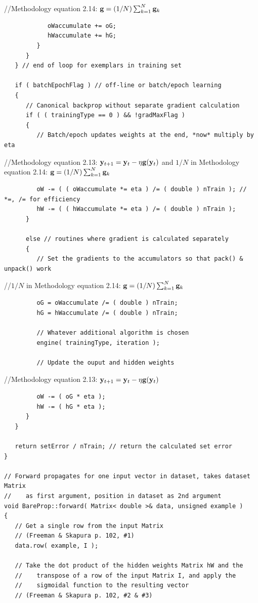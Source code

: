 \documentclass{report}[10pt]
\begin{document}
\hspace{48 pt}//\hspace{4 pt}Methodology equation 2.14: ${\bf g} = (1/N) \sum_{k=1}^N {\bf g}_k$
\begin{verbatim}
            oWaccumulate += oG;
            hWaccumulate += hG;
         }
      }
   } // end of loop for exemplars in training set

   if ( batchEpochFlag ) // off-line or batch/epoch learning
   {
      // Canonical backprop without separate gradient calculation
      if ( ( trainingType == 0 ) && !gradMaxFlag )
      {
         // Batch/epoch updates weights at the end, *now* multiply by eta
\end{verbatim}
\hspace{36 pt}//\hspace{4 pt}Methodology equation 2.13: ${\bf y}_{t+1} = {\bf y}_t - \eta {\bf g}({\bf y}_t)$
and $1/N$ in Methodology equation 2.14: ${\bf g} = (1/N) \sum_{k=1}^N {\bf g}_k$
\begin{verbatim}
         oW -= ( ( oWaccumulate *= eta ) /= ( double ) nTrain ); // *=, /= for efficiency
         hW -= ( ( hWaccumulate *= eta ) /= ( double ) nTrain );
      }
      
      else // routines where gradient is calculated separately
      {
         // Set the gradients to the accumulators so that pack() & unpack() work
\end{verbatim}
\hspace{36 pt}//\hspace{4 pt}$1/N$ in Methodology equation 2.14: ${\bf g} = (1/N) \sum_{k=1}^N {\bf g}_k$
\begin{verbatim}
         oG = oWaccumulate /= ( double ) nTrain;
         hG = hWaccumulate /= ( double ) nTrain;

         // Whatever additional algorithm is chosen
         engine( trainingType, iteration );

         // Update the ouput and hidden weights
\end{verbatim}
\hspace{36 pt}//\hspace{4 pt}Methodology equation 2.13: ${\bf y}_{t+1} = {\bf y}_t - \eta {\bf g}({\bf y}_t)$
\begin{verbatim}
         oW -= ( oG * eta );
         hW -= ( hG * eta );
      }
   }

   return setError / nTrain; // return the calculated set error
}

// Forward propagates for one input vector in dataset, takes dataset Matrix
//    as first argument, position in dataset as 2nd argument
void BareProp::forward( Matrix< double >& data, unsigned example )
{
   // Get a single row from the input Matrix
   // (Freeman & Skapura p. 102, #1)
   data.row( example, I );
   
   // Take the dot product of the hidden weights Matrix hW and the
   //    transpose of a row of the input Matrix I, and apply the
   //    sigmoidal function to the resulting vector
   // (Freeman & Skapura p. 102, #2 & #3)
\end{verbatim}
\end{document}
